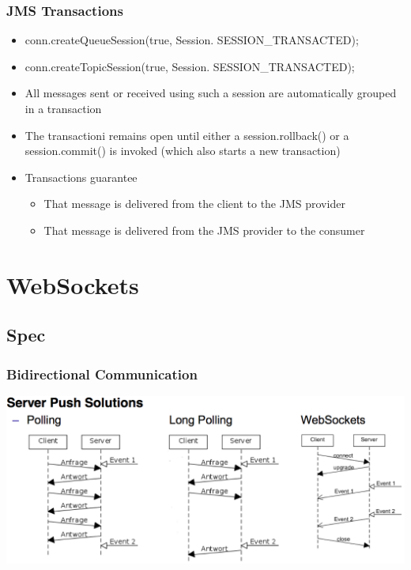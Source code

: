 \documentclass[10pt]{article}
\begin{document}
\subsubsection{JMS Transactions}
\begin{itemize}
	\item conn.createQueueSession(true, Session. SESSION\_TRANSACTED);
	\item conn.createTopicSession(true, Session. SESSION\_TRANSACTED);
	\item All messages sent or received using such a session are automatically grouped in a transaction
	\item The transactioni remains open until either a session.rollback() or a session.commit() is invoked (which also starts a new transaction)
	\item Transactions guarantee
		\begin{itemize}
			\item That message is delivered from the client to the JMS provider
			\item That message is delivered from the JMS provider to the consumer
		\end{itemize}
\end{itemize}

\newpage
\section{WebSockets}
\subsection{Spec}
\subsubsection{Bidirectional Communication}
\begin{center}
	\includegraphics[scale=0.2]{websockets-server-push-solutions.png}
\end{center}
\end{document}
